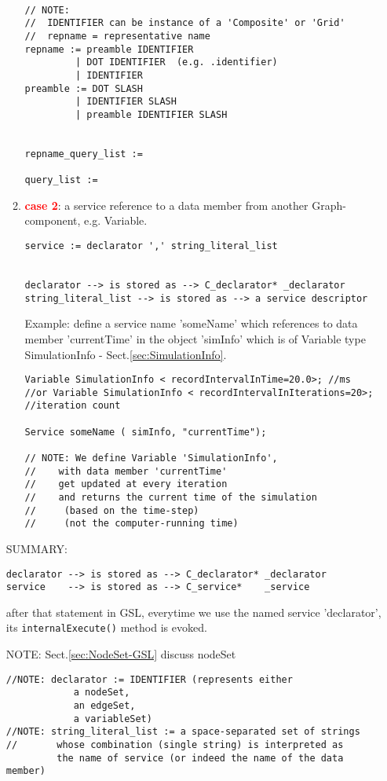 \begin{enumerate}
\begin{enumerate}
\begin{verbatim}
           
// NOTE: 
//  IDENTIFIER can be instance of a 'Composite' or 'Grid'
//  repname = representative name
repname := preamble IDENTIFIER
         | DOT IDENTIFIER  (e.g. .identifier)
         | IDENTIFIER
preamble := DOT SLASH
         | IDENTIFIER SLASH
         | preamble IDENTIFIER SLASH 


repname_query_list := 

query_list :=                    
\end{verbatim}

  
  \item \textcolor{red}{\bf case 2}: a service reference to a data member from
  another Graph-component, e.g. Variable.
   
\begin{verbatim}
service := declarator ',' string_literal_list


declarator --> is stored as --> C_declarator* _declarator
string_literal_list --> is stored as --> a service descriptor 
\end{verbatim}


Example: define a service name 'someName' which references to data member
'currentTime' in the object 'simInfo' which is of Variable type SimulationInfo
- Sect.\ref{sec:SimulationInfo}.

\begin{verbatim}
Variable SimulationInfo < recordIntervalInTime=20.0>; //ms
//or Variable SimulationInfo < recordIntervalInIterations=20>; //iteration count

Service someName ( simInfo, "currentTime");

// NOTE: We define Variable 'SimulationInfo',
//    with data member 'currentTime'
//    get updated at every iteration
//    and returns the current time of the simulation 
//     (based on the time-step) 
//     (not the computer-running time)
\end{verbatim}
 

\end{enumerate}

SUMMARY:
\begin{verbatim}
declarator --> is stored as --> C_declarator* _declarator
service    --> is stored as --> C_service*    _service
\end{verbatim} 
after that statement in GSL, everytime we use the named service 'declarator',
its \verb!internalExecute()! method is evoked.


NOTE: Sect.\ref{sec:NodeSet-GSL} discuss nodeSet
\begin{verbatim}
//NOTE: declarator := IDENTIFIER (represents either 
            a nodeSet, 
            an edgeSet, 
            a variableSet)
//NOTE: string_literal_list := a space-separated set of strings
//       whose combination (single string) is interpreted as 
         the name of service (or indeed the name of the data member)
\end{verbatim}



\end{enumerate}
